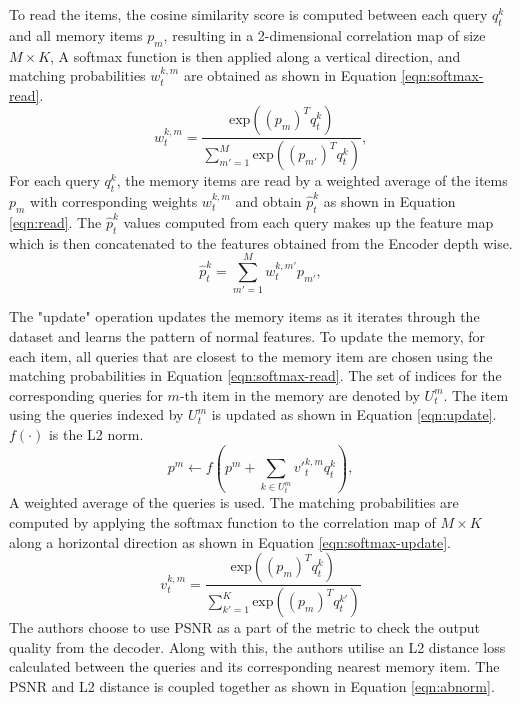 To read the items, the cosine similarity score is computed between each query ${q_{t}^{k{}}}$ and all memory items $p_{m}$, resulting in a 2-dimensional correlation map of size $M \times K$, A softmax function is then applied along a vertical direction, and matching probabilities $w_{t}^{k,m}$ are obtained as shown in Equation \ref{eqn:softmax-read}.
\begin{equation}
    \label{eqn:softmax-read}
     w_{t}^{k,m} = \frac{\textrm{exp}\left ( \left (p_{m}   \right )^{T}q_{t}^{k{}}\right )}{\sum_{{m}'=1}^{M}\textrm{exp}\left ( \left (p_{{m}'}   \right )^{T}q_{t}^{k{}}\right )},
 \end{equation}
 For each query ${q_{t}^{k{}}}$, the memory items are read by a weighted average of the items $p_{m}$ with corresponding weights $w_{t}^{k,m}$ and obtain $\hat{p}_{t}^{k}$ as shown in Equation \ref{eqn:read}. The $\hat{p}_{t}^{k}$ values computed from each query makes up the feature map which is then concatenated to the features obtained from the Encoder depth wise.
 \begin{equation}
    \label{eqn:read}
     \hat{p}_{t}^{k} = \sum_{{m}'=1}^{M}w_{t}^{k,{m}'}p_{{m}'}, 
 \end{equation}

The "update" operation updates the memory items as it iterates through the dataset and learns the pattern of normal features. To update the memory, for each item, all queries that are closest to the memory item are chosen using the matching probabilities in Equation \ref{eqn:softmax-read}. The set of indices for the corresponding queries for $m$-th item in the memory are denoted by $U_{t}^{m}$. The item using the queries indexed by $U_{t}^{m}$ is updated as shown in Equation \ref{eqn:update}. $f(\cdot)$ is the L2 norm.
 \begin{equation}
    \label{eqn:update}
     p^{m}\leftarrow f\left (p^{m} + \sum_{k\in U_{t}^{m}}{{v}'}_{t}^{k,m}q_{t}^{k} \right ),  
 \end{equation}
A weighted average of the queries is used. The matching probabilities are computed by applying the softmax function to the correlation map of $M \times K$ along a horizontal direction as shown in Equation \ref{eqn:softmax-update}.
\begin{equation}
    \label{eqn:softmax-update}
     v_{t}^{k,m} = \frac{\textrm{exp}\left ( \left (p_{m}   \right )^{T}q_{t}^{k{}}\right )}{\sum_{{k}'=1}^{K}\textrm{exp}\left ( \left (p_{m}   \right )^{T}q_{t}^{{k}'{}}\right )}
 \end{equation}
The authors choose to use PSNR as a part of the metric to check the output quality from the decoder. Along with this, the authors utilise an L2 distance loss calculated between the queries and its corresponding nearest memory item. The PSNR and L2 distance is coupled together as shown in Equation \ref{eqn:abnorm}. 

